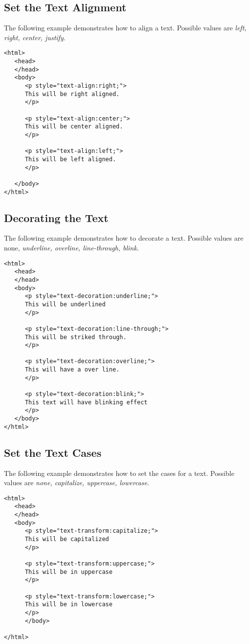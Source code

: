\documentclass[a4paper,oneside]{book}
\numberwithin{equation}{chapter}
\begin{document}
\subsection{Set the Text Alignment}
The following example demonstrates how to align a text. Possible values are \textit{left, right, center, justify}.
\begin{verbatim}
<html>
   <head>
   </head>
   <body>
      <p style="text-align:right;">
      This will be right aligned.
      </p>
      
      <p style="text-align:center;">
      This will be center aligned.
      </p>
      
      <p style="text-align:left;">
      This will be left aligned.
      </p>
      
   </body>
</html>
\end{verbatim}
\subsection{Decorating the Text}
The following example demonstrates how to decorate a text. Possible values are none, \textit{underline, overline, line-through, blink.}
\begin{verbatim}
<html>
   <head>
   </head>
   <body>
      <p style="text-decoration:underline;">
      This will be underlined
      </p>
      
      <p style="text-decoration:line-through;">
      This will be striked through.
      </p>
      
      <p style="text-decoration:overline;">
      This will have a over line.
      </p>
      
      <p style="text-decoration:blink;">
      This text will have blinking effect
      </p>
   </body>
</html>
\end{verbatim}
\subsection{Set the Text Cases}
The following example demonstrates how to set the cases for a text. Possible values are \textit{none, capitalize, uppercase, lowercase}.
\begin{verbatim}
<html>
   <head>
   </head>
   <body>
      <p style="text-transform:capitalize;">
      This will be capitalized
      </p>
      
      <p style="text-transform:uppercase;">
      This will be in uppercase
      </p>
      
      <p style="text-transform:lowercase;">
      This will be in lowercase
      </p>
      </body>

</html>
\end{verbatim}
\end{document}
